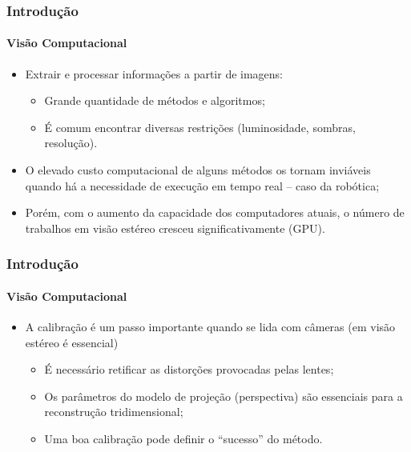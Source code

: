 \documentclass[brazil]{beamer}
\begin{document}

\begin{frame}
\frametitle{Introdução}
\framesubtitle{Visão Computacional}
\begin{itemize}
  \item Extrair e processar informações a partir de imagens:
  \begin{itemize}
    \item Grande quantidade de métodos e algoritmos;
    \item É comum encontrar diversas restrições (luminosidade, sombras,
    resolução).
  \end{itemize}
  \item O elevado custo computacional de alguns métodos os tornam inviáveis
  quando há a necessidade de execução em tempo real – caso da robótica;
  \item Porém, com o aumento da capacidade dos computadores atuais, o número de
  trabalhos em visão estéreo cresceu significativamente (GPU).
\end{itemize}
\end{frame}

\begin{frame}
\frametitle{Introdução}
\framesubtitle{Visão Computacional}
\begin{itemize}
  \item A calibração é um passo importante quando se lida com câmeras (em visão estéreo é essencial)
   \begin{itemize}
     \item É necessário retificar as distorções provocadas pelas lentes;
     \item Os parâmetros do modelo de projeção (perspectiva) são essenciais para
     a reconstrução tridimensional;
     \item Uma boa calibração pode definir o “sucesso” do método.
\end{itemize}
\end{itemize}
\end{frame}
\end{document}
